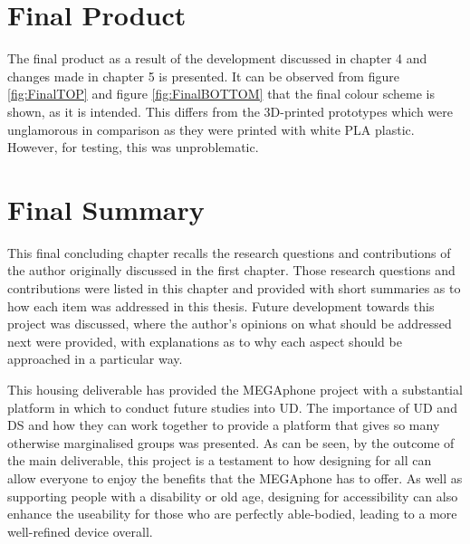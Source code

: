 \section{Final Product}
The final product as a result of the development discussed in chapter 4 and changes made in chapter 5 is presented.
It can be observed from figure \ref{fig:FinalTOP} and figure \ref{fig:FinalBOTTOM} that the final colour scheme is shown, as it is intended.
This differs from the 3D-printed prototypes which were unglamorous in comparison as they were printed with white PLA plastic.
However, for testing, this was unproblematic.


\section{Final Summary}
This final concluding chapter recalls the research questions and contributions of the author originally discussed in the first chapter.
Those research questions and contributions were listed in this chapter and provided with short summaries as to how each item was addressed in this thesis.
Future development towards this project was discussed, where the author's opinions on what should be addressed next were provided, with explanations as to why each aspect should be approached in a particular way.

This housing deliverable has provided the MEGAphone project with a substantial platform in which to conduct future studies into UD.
The importance of UD and DS and how they can work together to provide a platform that gives so many otherwise marginalised groups was presented.
As can be seen, by the outcome of the main deliverable, this project is a testament to how designing for all can allow everyone to enjoy the benefits that the MEGAphone has to offer.
As well as supporting people with a disability or old age, designing for accessibility can also enhance the useability for those who are perfectly able-bodied, leading to a more well-refined device overall.